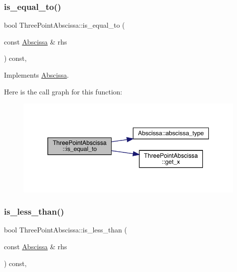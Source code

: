 \subsubsection{\texorpdfstring{is\_equal\_to()}{is\_equal\_to()}}
{\footnotesize\ttfamily bool Three\+Point\+Abscissa\+::is\+\_\+equal\+\_\+to (\begin{DoxyParamCaption}\item[{const \mbox{\hyperlink{classAbscissa}{Abscissa}} \&}]{rhs }\end{DoxyParamCaption}) const\hspace{0.3cm}{\ttfamily [inline]}, {\ttfamily [virtual]}}



Implements \mbox{\hyperlink{classAbscissa_a4adf4055c1eee010f9493e0ebb66348a}{Abscissa}}.

Here is the call graph for this function\+:
\nopagebreak
\begin{figure}[H]
\begin{center}
\leavevmode
\includegraphics[width=346pt]{df/d59/classThreePointAbscissa_a91dd5c897c1b2b1fe271597fdc0d5c3d_cgraph}
\end{center}
\end{figure}
\mbox{\label{classThreePointAbscissa_a2e0b64a578a1dda361a4ef3dd61f75e8}} 
\subsubsection{\texorpdfstring{is\_less\_than()}{is\_less\_than()}}
{\footnotesize\ttfamily bool Three\+Point\+Abscissa\+::is\+\_\+less\+\_\+than (\begin{DoxyParamCaption}\item[{const \mbox{\hyperlink{classAbscissa}{Abscissa}} \&}]{rhs }\end{DoxyParamCaption}) const\hspace{0.3cm}{\ttfamily [inline]}, {\ttfamily [virtual]}}



